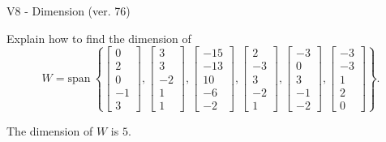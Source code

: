\begin{exercise}
  \begin{exerciseTitle}V8 - Dimension (ver. 76)\end{exerciseTitle}
  \begin{exerciseStatement}
    Explain how to find the dimension of 
\[W=\mathrm{span}\ \left\{\left[\begin{array}{r}
0 \\
2 \\
0 \\
-1 \\
3
\end{array}\right] , \left[\begin{array}{r}
3 \\
3 \\
-2 \\
1 \\
1
\end{array}\right] , \left[\begin{array}{r}
-15 \\
-13 \\
10 \\
-6 \\
-2
\end{array}\right] , \left[\begin{array}{r}
2 \\
-3 \\
3 \\
-2 \\
1
\end{array}\right] , \left[\begin{array}{r}
-3 \\
0 \\
3 \\
-1 \\
-2
\end{array}\right] , \left[\begin{array}{r}
-3 \\
-3 \\
1 \\
2 \\
0
\end{array}\right]\right\}.\]



  \end{exerciseStatement}
  \begin{exerciseAnswer}
   The dimension of \(W\) is  \(5\).
  


  \end{exerciseAnswer}
\end{exercise}